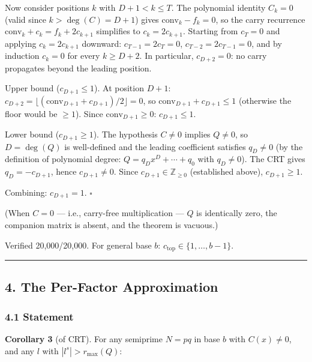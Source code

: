\documentclass[
  11pt,
]{article}
\begin{document}
Now consider positions \(k\) with \(D + 1 < k \leq T\). The polynomial identity
\(C_k = 0\) (valid since \(k > \deg(C) = D + 1\)) gives
\(\text{conv}_k - f_k = 0\), so the carry recurrence
\(\text{conv}_k + c_k = f_k + 2c_{k+1}\) simplifies to \(c_k = 2c_{k+1}\).
Starting from \(c_T = 0\) and applying \(c_k = 2c_{k+1}\) downward:
\(c_{T-1} = 2c_T = 0\), \(c_{T-2} = 2c_{T-1} = 0\), and by induction \(c_k = 0\)
for every \(k \geq D + 2\). In particular, \(c_{D+2} = 0\): no carry propagates
beyond the leading position.

Upper bound (\(c_{D+1} \leq 1\)). At position \(D + 1\):
\(c_{D+2} = \lfloor(\text{conv}_{D+1} + c_{D+1})/2\rfloor = 0\), so
\(\text{conv}_{D+1} + c_{D+1} \leq 1\) (otherwise the floor would be
\(\geq 1\)). Since \(\text{conv}_{D+1} \geq 0\): \(c_{D+1} \leq 1\).

Lower bound (\(c_{D+1} \geq 1\)). The hypothesis \(C \neq 0\) implies
\(Q \neq 0\), so \(D = \deg(Q)\) is well-defined and the leading coefficient
satisfies \(q_D \neq 0\) (by the definition of polynomial degree:
\(Q = q_D x^D + \cdots + q_0\) with \(q_D \neq 0\)). The CRT gives
\(q_D = -c_{D+1}\), hence \(c_{D+1} \neq 0\). Since
\(c_{D+1} \in \mathbb{Z}_{\geq 0}\) (established above), \(c_{D+1} \geq 1\).

Combining: \(c_{D+1} = 1\). \(\square\)

(When \(C = 0\) --- i.e., carry-free multiplication --- \(Q\) is identically
zero, the companion matrix is absent, and the theorem is vacuous.)

Verified 20,000/20,000. For general base \(b\):
\(c_{\text{top}} \in \lbrace{}1, \ldots, b-1\rbrace{}\).

\begin{center}\rule{0.5\linewidth}{0.5pt}\end{center}

\newpage

\subsection{4. The Per-Factor Approximation}\label{the-per-factor-approximation}

\subsubsection{4.1 Statement}\label{statement}

\textbf{Corollary 3} (of CRT). For any semiprime \(N = pq\) in base \(b\) with
\(C(x) \neq 0\), and any \(l\) with \(|l^s| > r_{\max}(Q)\):
\end{document}
